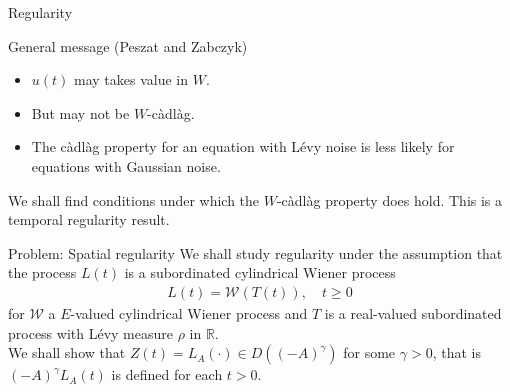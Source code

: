\documentclass[xcolor=dvipsnames,leqno]{beamer}
\begin{document}
\begin{frame}{Regularity}

\begin{block}{General message (Peszat and Zabczyk)}
	\begin{itemize}
		\item  $u(t)$ may takes value in $W$.
		\item  But may not be $W$-c\`adl\`ag.
		\item  The c\`adl\`ag property for an equation with L\'evy noise is less likely for equations with Gaussian noise.
	\end{itemize}
	
\end{block}  
\vspace{1cm} 
We shall find conditions under which the $W$-c\`adl\`ag property does hold. This is a temporal regularity result. 
\end{frame}
\begin{frame}{Problem: Spatial regularity}       
We shall study regularity under the assumption that the process $L(t)$ is a subordinated cylindrical Wiener process
\begin{align*}
	L(t)=\mathcal{W}(T(t)),\quad t\geq 0
\end{align*}
for $\mathcal{W}$ a $E$-valued cylindrical Wiener process and $T$ is a real-valued subordinated process with L\'evy measure $\rho$ in $\mathbb{R}$.\\
\vspace{1.5cm}
{\color{purple}We shall show that $Z(t)=L_A(\cdot)\in D((-A)^{\gamma})$ for some $\gamma>0$, that is $(-A)^{\gamma}L_A(t)$ is defined for each $t>0$.}
\end{frame}
\end{document}
